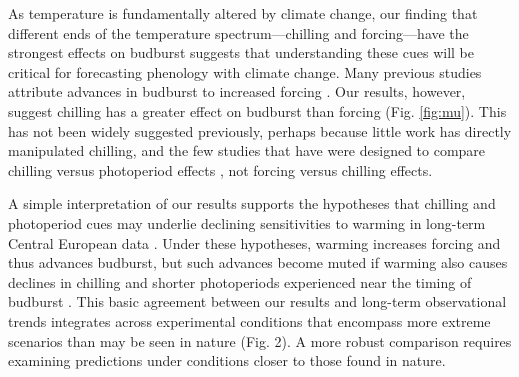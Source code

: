 \documentclass{article}
\begin{document}
\par As temperature is fundamentally altered by climate change, our finding that different ends of the temperature spectrum---chilling and forcing---have the strongest effects on budburst suggests that understanding these cues will be critical for forecasting phenology with climate change. Many previous studies attribute advances in budburst to increased forcing \citep{Basler:2014aa,bradley1999,menzel2006,harrington2015}. %
Our results, however, suggest chilling has a greater effect on budburst than forcing (Fig. \ref{fig:mu}). This has not been widely suggested previously, perhaps because little work has directly manipulated chilling, and the few studies that have were designed to compare chilling versus photoperiod effects \citep[e.g., ][]{Basler:2014aa,Caffarra:2011qf,Laube:2014a,zohner2016}, not forcing versus chilling effects. 

\par A simple interpretation of our results supports the hypotheses that chilling and photoperiod cues may underlie declining sensitivities to warming in long-term Central European data \citep{Rutishauser:2008,yu2010,fu2015}. Under these hypotheses, warming increases forcing and thus advances budburst, but such advances become muted if warming also causes declines in chilling and shorter photoperiods experienced near the timing of budburst 
\citep{koerner2010a}. %
This basic agreement between our results and long-term observational trends integrates across experimental conditions that encompass more extreme scenarios than may be seen in nature (Fig. 2). A more robust comparison requires examining predictions under conditions closer to those found in nature.

\end{document}
